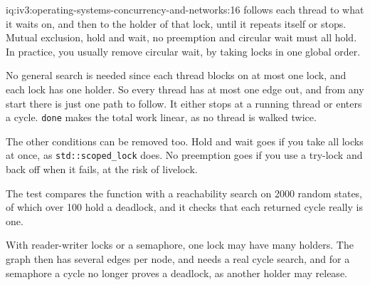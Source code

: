 \begin{solution}{iq:iv3:operating-systems-concurrency-and-networks:16}
 follows each thread to what it waits on, and then to the holder of that lock, until it repeats itself or stops. Mutual exclusion, hold and wait, no preemption and circular wait must all hold. In practice, you usually remove circular wait, by taking locks in one global order.
\enlargethispage{-2\baselineskip}%
\label{lst:iv3:os:waitfor}

No general search is needed since each thread blocks on at most one lock, and each lock has one holder. So every thread has at most one edge out, and from any start there is just one path to follow. It either stops at a running thread or enters a cycle. \texttt{done} makes the total work linear, as no thread is walked twice.

The other conditions can be removed too. Hold and wait goes if you take all locks at once, as \texttt{std::scoped\_lock} does. No preemption goes if you use a try-lock and back off when it fails, at the risk of livelock.

The test compares the function with a reachability search on 2000 random states, of which over 100 hold a deadlock, and it checks that each returned cycle really is one.

With reader-writer locks or a semaphore, one lock may have many holders. The graph then has several edges per node, and needs a real cycle search, and for a semaphore a cycle no longer proves a deadlock, as another holder may release.

\end{solution}

